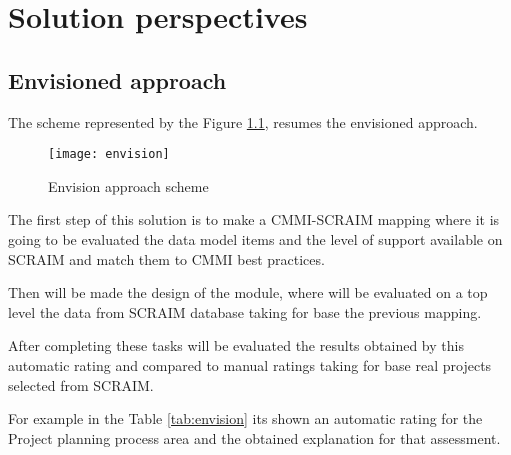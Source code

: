 \chapter{Solution perspectives}\label{chap:chap4}

\section{Envisioned approach}

The scheme represented by the Figure \ref{fig:envision}, resumes the envisioned approach.

\begin{figure}[h]
	\begin{center}
		\leavevmode
		\texttt{[image: envision]}
		\caption{Envision approach scheme}
		\label{fig:envision}
	\end{center}
\end{figure}

The first step of this solution is to make a CMMI-SCRAIM mapping where it is going to be evaluated the data model items and the level of support available on SCRAIM and match them to CMMI best practices.

Then will be made the design of the module, where will be evaluated on a top level the data from SCRAIM database taking for base the previous mapping.

After completing these tasks will be evaluated the results obtained by this automatic rating and compared to manual ratings taking for base real projects selected from SCRAIM. 

For example in the Table \ref{tab:envision} its shown an automatic rating for the Project planning process area and the obtained explanation for that assessment. 


